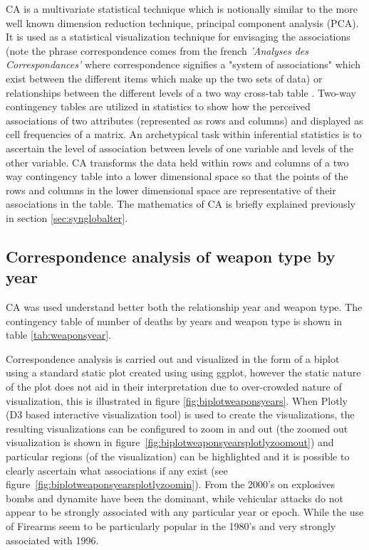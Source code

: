 CA is a multivariate statistical technique which is notionally similar to the more well known dimension reduction technique, principal component analysis (PCA). It is used as a statistical visualization technique for envisaging the associations (note the phrase correspondence comes from the french \textit{'Analyses des Correspondances'} where correspondence signifies a "system of associations" which exist between the different items which make up the two sets of data) or relationships between the different levels of a two way cross-tab table \citep{husson2010exploratory}. Two-way contingency tables are utilized in statistics to show how the perceived associations of two attributes (represented as rows and columns) and displayed as cell frequencies of a matrix. An archetypical task within inferential statistics is to ascertain the level of association between levels of one variable and levels of the other variable. CA transforms the data held within rows and columns of a two way contingency table into a lower dimensional space so that the points of the rows and columns in the lower dimensional space are representative of their associations in the table. The mathematics of CA is briefly explained previously in section \ref{sec:synglobalter}.  

\subsection{Correspondence analysis of weapon type by year}\label{viewing-deaths-by-weapon-vector-type-CA}

CA was used understand better both the relationship year and weapon type. The contingency table of number of deaths by years and weapon type is shown in table \ref{tab:weaponsyear}.

Correspondence analysis is carried out and visualized in the form of a biplot using a standard static plot created using using ggplot, however the static nature of the plot does not aid in their interpretation due to over-crowded nature of visualization, this is illustrated in figure \ref{fig:biplotweaponsyears}. When Plotly (D3 based interactive visualization tool) is used to create the visualizations, the resulting visualizations can be configured to zoom in and out (the zoomed out visualization is shown in figure~\ref{fig:biplotweaponsyearsplotlyzoomout}) and particular regions (of the visualization) can be highlighted and it is possible to clearly ascertain what associations if any exist (see figure~\ref{fig:biplotweaponsyearsplotlyzoomin}). From the 2000's on explosives bombs and dynamite have been the dominant, while vehicular attacks do not appear to be strongly associated with any particular year or epoch. While the use of Firearms seem to be particularly popular in the 1980's and very strongly associated with 1996.
 
